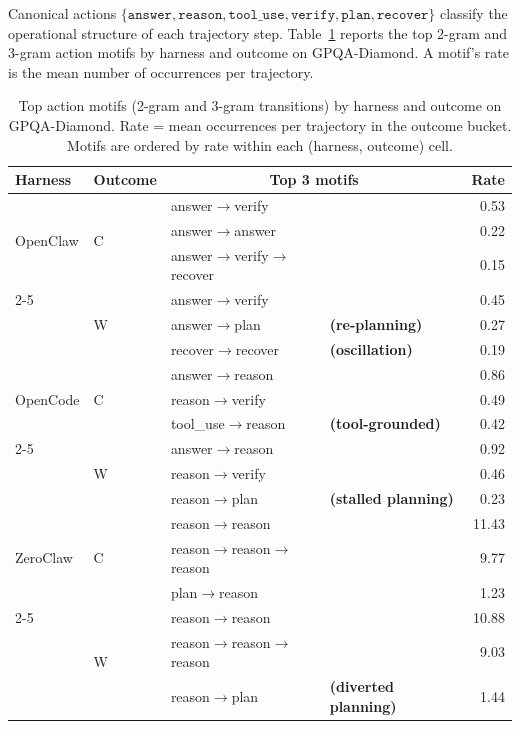 Canonical actions $\{\texttt{answer}, \texttt{reason}, \texttt{tool\_use},
\texttt{verify}, \texttt{plan}, \texttt{recover}\}$ classify the operational
structure of each trajectory step.
Table~\ref{tab:cross-action-motifs} reports the top 2-gram and 3-gram action
motifs by harness and outcome on GPQA-Diamond.
A motif's rate is the mean number of occurrences per trajectory.

\begin{table}[t]
\centering
\small
\caption{%
  Top action motifs (2-gram and 3-gram transitions) by harness and outcome
  on GPQA-Diamond.
  Rate = mean occurrences per trajectory in the outcome bucket.
  Motifs are ordered by rate within each (harness, outcome) cell.
}
\label{tab:cross-action-motifs}
\setlength{\tabcolsep}{3pt}
\begin{tabular}{llllr}
\toprule
Harness & Outcome & \multicolumn{2}{c}{Top 3 motifs} & Rate \\
\midrule
\multirow{3}{*}{OpenClaw}
  & \multirow{3}{*}{C}
    & answer$\to$verify            & & 0.53 \\
  & & answer$\to$answer            & & 0.22 \\
  & & answer$\to$verify$\to$recover &  & 0.15 \\
\cmidrule{2-5}
  & \multirow{3}{*}{W}
    & answer$\to$verify            & & 0.45 \\
  & & answer$\to$plan              & \textbf{(re-planning)} & 0.27 \\
  & & recover$\to$recover          & \textbf{(oscillation)} & 0.19 \\
\midrule
\multirow{3}{*}{OpenCode}
  & \multirow{3}{*}{C}
    & answer$\to$reason            & & 0.86 \\
  & & reason$\to$verify            & & 0.49 \\
  & & tool\_use$\to$reason         & \textbf{(tool-grounded)} & 0.42 \\
\cmidrule{2-5}
  & \multirow{3}{*}{W}
    & answer$\to$reason            & & 0.92 \\
  & & reason$\to$verify            & & 0.46 \\
  & & reason$\to$plan              & \textbf{(stalled planning)} & 0.23 \\
\midrule
\multirow{3}{*}{ZeroClaw}
  & \multirow{3}{*}{C}
    & reason$\to$reason            & & 11.43 \\
  & & reason$\to$reason$\to$reason & & 9.77 \\
  & & plan$\to$reason              & & 1.23 \\
\cmidrule{2-5}
  & \multirow{3}{*}{W}
    & reason$\to$reason            & & 10.88 \\
  & & reason$\to$reason$\to$reason & & 9.03 \\
  & & reason$\to$plan              & \textbf{(diverted planning)} & 1.44 \\
\bottomrule
\end{tabular}
\end{table}

